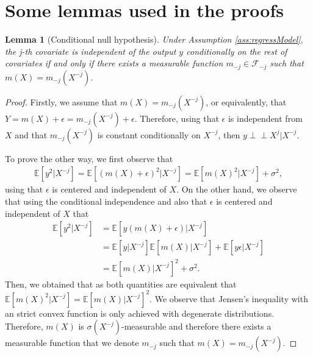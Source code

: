 \documentclass{article}
\theoremstyle{plain}
\newtheorem{lemma}[theorem]{Lemma}
\theoremstyle{definition}
\theoremstyle{remark}
\newcommand{\e}[1]{\mathbb{E}\left[#1\right]  } %
\begin{document}
\section{Some lemmas used in the proofs}

\begin{lemma}[Conditional null hypothesis]\label{lemma:nullHyp} Under Assumption \ref{ass:regressModel}, the j-th covariate is independent of the output $y$ conditionally on the rest of covariates if and only if there exists a measurable function $m_{-j}\in\mathcal{F}_{-j}$ such that $m(X)=m_{-j}(X^{-j})$.    
\end{lemma}

\begin{proof}
    Firstly, we assume that $m(X)=m_{-j}(X^{-j})$, or equivalently, that $Y=m(X)+\epsilon=m_{-j}(X^{-j})+\epsilon$. Therefore, using that $\epsilon$ is independent from $X$ and that $m_{-j}(X^{-j})$ is constant conditionally on $X^{-j}$, then $y\perp\!\!\!\perp X^{j}|X^{-j}$.


    To prove the other way, we first observe that 
    \begin{align*}
        \e{y^2|X^{-j}}=\e{(m(X)+\epsilon)^2|X^{-j}}=\e{m(X)^2|X^{-j}}+\sigma^2,
    \end{align*}
    using that $\epsilon$ is centered and independent of $X$.
    On the other hand, we observe that using the conditional independence and also that $\epsilon$ is centered and independent of $X$ that 
    \begin{align*}
        \e{y^2|X^{-j}}&=\e{y(m(X)+\epsilon)|X^{-j}}\\&=\e{y|X^{-j}}\e{m(X)|X^{-j}}+\e{y\epsilon|X^{-j}}\\&=\e{m(X)|X^{-j}}^2+\sigma^2.
    \end{align*}
    Then, we obtained that as both quantities are equivalent that $\e{m(X)^2|X^{-j}}=\e{m(X)|X^{-j}}^2$. We observe that Jensen's inequality with an strict convex function is only achieved with degenerate distributions. Therefore, $m(X)$ is $\sigma(X^{-j})$-measurable and therefore there exists a measurable function that we denote $m_{-j}$ such that $m(X)=m_{-j}(X^{-j})$. 
    
\end{proof}
\end{document}
